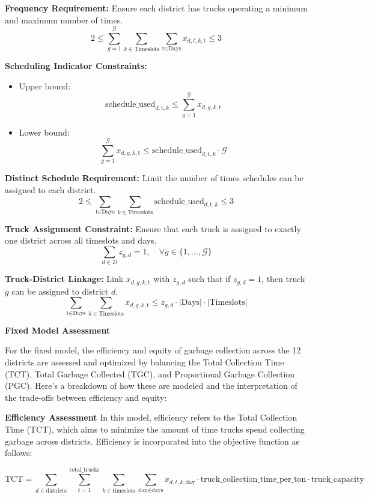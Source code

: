 \documentclass{article}
\begin{document}
\textbf{Frequency Requirement:} Ensure each district has trucks operating a minimum and maximum number of times.
\[
2 \leq \sum_{g=1}^{\mathcal{G}} \sum_{k \in \text{Timeslots}} \sum_{\text{t} \in \text{Days}} x_{d,t,k,\text{t}} \leq 3
\]

\textbf{Scheduling Indicator Constraints:}
\begin{itemize}
    \item Upper bound:
    \[
    \text{schedule\_used}_{d, \text{t}, k} \leq \sum_{g=1}^{\mathcal{G}} x_{d,g,k,\text{t}}
    \]
    \item Lower bound:
    \[
    \sum_{g=1}^{\mathcal{G}} x_{d,g,k,\text{t}} \leq \text{schedule\_used}_{d, \text{t}, k} \cdot \mathcal{G}
    \]
\end{itemize}

\textbf{Distinct Schedule Requirement:} Limit the number of times schedules can be assigned to each district.
\[
2 \leq \sum_{\text{t} \in \text{Days}} \sum_{k \in \text{Timeslots}} \text{schedule\_used}_{d, \text{t}, k} \leq 3
\]

\textbf{Truck Assignment Constraint:} Ensure that each truck is assigned to exactly one district across all timeslots and days.
\[
\sum_{d \in D} z_{g,d} = 1, \quad \forall g \in \{1, \dots, \mathcal{G}\}
\]

\textbf{Truck-District Linkage:} Link \( x_{d,g,k,\text{t}} \) with \( z_{g,d} \) such that if \( z_{g,d} = 1 \), then truck \( g\) can be assigned to district \( d \).
\[
\sum_{\text{t} \in \text{Days}} \sum_{k \in \text{Timeslots}} x_{d,g,k,\text{t}} \leq z_{g,d} \cdot |\text{Days}| \cdot |\text{Timeslots}|
\]

\textbf{{Fixed Model Assessment}}

For the fixed model, the efficiency and equity of garbage collection across the 12 districts are assessed and optimized by balancing the Total Collection Time (TCT), Total Garbage Collected (TGC), and Proportional Garbage Collection (PGC). Here’s a breakdown of how these are modeled and the interpretation of the trade-offs between efficiency and equity:

\textbf{{Efficiency Assessment}}
In this model, efficiency refers to the Total Collection Time (TCT), which aims to minimize the amount of time trucks spend collecting garbage across districts. Efficiency is incorporated into the objective function as follows:

\[
\text{TCT} = \sum_{d \in \text{districts}} \sum_{t=1}^{\text{total\_trucks}} \sum_{k \in \text{timeslots}} \sum_{\text{day} \in \text{days}} x_{d,t,k,\text{day}} \cdot \text{truck\_collection\_time\_per\_ton} \cdot \text{truck\_capacity}
\]
\end{document}
